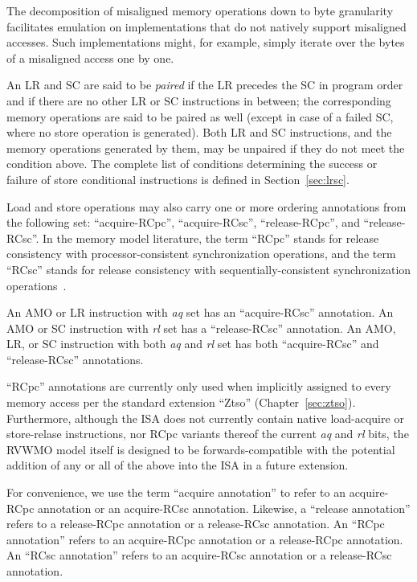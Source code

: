 \begin{commentary}
  The decomposition of misaligned memory operations down to byte granularity facilitates emulation on implementations that do not natively support misaligned accesses.
  Such implementations might, for example, simply iterate over the bytes of a misaligned access one by one.
\end{commentary}

An LR and SC are said to be {\em paired} if the LR precedes the SC in program order and if there are no other LR or SC instructions in between; the corresponding memory operations are said to be paired as well (except in case of a failed SC, where no store operation is generated).
Both LR and SC instructions, and the memory operations generated by them, may be unpaired if they do not meet the condition above.
The complete list of conditions determining the success or failure of store conditional instructions is defined in Section~\ref{sec:lrsc}.

Load and store operations may also carry one or more ordering annotations from the following set: ``acquire-RCpc'', ``acquire-RCsc'', ``release-RCpc'', and ``release-RCsc''.
In the memory model literature, the term ``RCpc'' stands for release consistency with processor-consistent synchronization operations, and the term ``RCsc'' stands for release consistency with sequentially-consistent synchronization operations~\cite{Gharachorloo90memoryconsistency}.

An AMO or LR instruction with {\em aq} set has an ``acquire-RCsc'' annotation.
An AMO or SC instruction with {\em rl} set has a ``release-RCsc'' annotation.
An AMO, LR, or SC instruction with both {\em aq} and {\em rl} set has both ``acquire-RCsc'' and ``release-RCsc'' annotations.

\begin{commentary}
  ``RCpc'' annotations are currently only used when implicitly assigned to every memory access per the standard extension ``Ztso'' (Chapter~\ref{sec:ztso}).  Furthermore, although the ISA does not currently contain native load-acquire or store-relase instructions, nor RCpc variants thereof the current {\em aq} and {\em rl} bits, the RVWMO model itself is designed to be forwards-compatible with the potential addition of any or all of the above into the ISA in a future extension.
\end{commentary}

For convenience, we use the term ``acquire annotation'' to refer to an acquire-RCpc annotation or an acquire-RCsc annotation.
Likewise, a ``release annotation'' refers to a release-RCpc annotation or a release-RCsc annotation.
An ``RCpc annotation'' refers to an acquire-RCpc annotation or a release-RCpc annotation.
An ``RCsc annotation'' refers to an acquire-RCsc annotation or a release-RCsc annotation.

